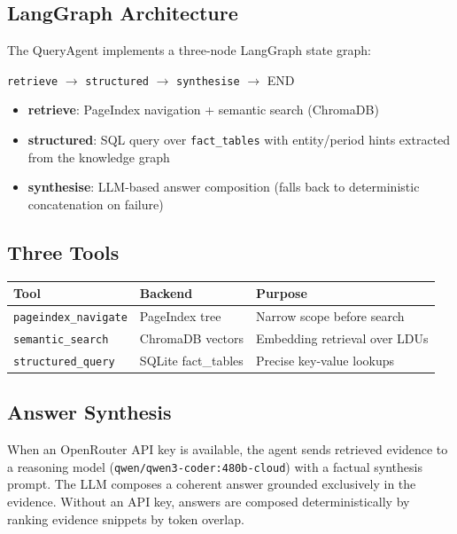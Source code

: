 \documentclass[12pt,a4paper]{article}
\begin{document}
\subsection{LangGraph Architecture}

The QueryAgent implements a three-node LangGraph state graph:

\begin{center}
\texttt{retrieve} $\to$ \texttt{structured} $\to$ \texttt{synthesise} $\to$ END
\end{center}

\begin{itemize}[nosep]
    \item \textbf{retrieve}: PageIndex navigation + semantic search (ChromaDB)
    \item \textbf{structured}: SQL query over \texttt{fact\_tables} with
          entity/period hints extracted from the knowledge graph
    \item \textbf{synthesise}: LLM-based answer composition (falls back to
          deterministic concatenation on failure)
\end{itemize}

\subsection{Three Tools}

\begin{center}
\begin{tabular}{lll}
\toprule
\textbf{Tool} & \textbf{Backend} & \textbf{Purpose} \\
\midrule
\texttt{pageindex\_navigate} & PageIndex tree     & Narrow scope before search \\
\texttt{semantic\_search}    & ChromaDB vectors   & Embedding retrieval over LDUs \\
\texttt{structured\_query}   & SQLite fact\_tables & Precise key-value lookups \\
\bottomrule
\end{tabular}
\end{center}

\subsection{Answer Synthesis}

When an OpenRouter API key is available, the agent sends retrieved evidence
to a reasoning model (\texttt{qwen/qwen3-coder:480b-cloud}) with a factual synthesis
prompt.  The LLM composes a coherent answer grounded exclusively in the
evidence.  Without an API key, answers are composed deterministically by
ranking evidence snippets by token overlap.
\end{document}
